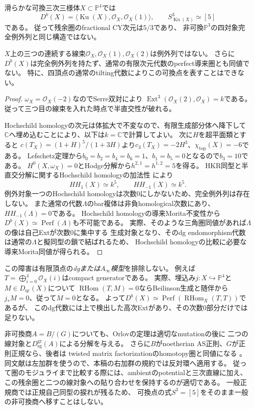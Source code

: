 滑らかな可換三次三様体$X\subset\mathbb P^4$では
\[
 D^b(X)=\langle\operatorname{Ku}(X),\mathcal O_X,\mathcal O_X(1)\rangle,
 \qquad S_{\operatorname{Ku}(X)}^3\simeq[5]
\]
である\cite[Corollary~4.1]{KuznetsovFractionalCY}。
従って残余圏のfractional CY次元は$5/3$であり、
非可換$\mathbb P^3$の四対象完全例外列と同じ構造ではない。

\begin{proposition}[普通のtilting代数に対する可換点の障害]
\label{prop:cubic-p3-no-ordinary-tilting}
$X$上の三つの連続する線束$\mathcal O_X,\mathcal O_X(1),\mathcal O_X(2)$は例外列ではない。
さらに$D^b(X)$は完全例外列を持たず、通常の有限次元代数のperfect導来圏とも同値でない。
特に、四頂点の通常のtilting代数によりこの可換点を表すことはできない。
\end{proposition}
\begin{proof}
$\omega_X=\mathcal O_X(-2)$なのでSerre双対により
$\operatorname{Ext}^3(\mathcal O_X(2),\mathcal O_X)=k$である。
従って三つ目の線束を入れた時点で半直交性が破れる。

Hochschild homologyの次元は体拡大で不変なので、有限生成部分体へ降下して
$\mathbb C$へ埋め込むことにより、以下は$k=\mathbb C$で計算してよい。
次に$H$を超平面類とすると
$c(T_X)=(1+H)^5/(1+3H)$より$c_3(T_X)=-2H^3$、$\chi_{\mathrm{top}}(X)=-6$である。
Lefschetz定理から$b_0=b_2=b_4=b_6=1$、$b_1=b_5=0$となるので$b_3=10$である。
$H^0(X,\omega_X)=0$とHodge分解から$h^{2,1}=h^{1,2}=5$を得る。
HKR同型と半直交分解に関するHochschild homologyの加法性
\cite[Theorem~8.3, Corollary~7.5]{KuznetsovHochschild}により
\[
 HH_1(X)\simeq k^5,\qquad HH_{-1}(X)\simeq k^5.
\]
例外対象一つのHochschild homologyは次数0にしかないため、完全例外列は存在しない。
また通常の代数$\Lambda$のbar複体は非負homological次数にあり、$HH_{-1}(\Lambda)=0$である。
Hochschild homologyの導来Morita不変性から
$D^b(X)\simeq\operatorname{Perf}(\Lambda)$も不可能である。
実際、そのような三角圏同値があれば$\Lambda$の像は自己Extが次数0に集中する
生成対象となり、そのdg endomorphism代数は通常の$\Lambda$と擬同型の鎖で結ばれるため、
Hochschild homologyの比較に必要な導来Morita同値が得られる。
\end{proof}

この障害は有限頂点の\emph{dgまたは$A_\infty$模型}を排除しない。
例えば$T=\bigoplus_{i=0}^{4}\mathcal O_X(i)$はcompact generatorである。
実際、埋込み$j:X\hookrightarrow\mathbb P^4$と$M\in D_{\mathrm{qc}}(X)$について
$\operatorname{RHom}(T,M)=0$ならBeilinson生成と随伴から$j_*M=0$、従って$M=0$となる。
よって$D^b(X)\simeq\operatorname{Perf}(\operatorname{RHom}_X(T,T))$であるが、
このdg代数には上で検出した高次Extがあり、その次数0部分だけでは足りない。

非可換商$A=B/(G)$についても、Orlovの定理は適切なmutationの後に
二つの線対象と$D^{\mathrm{gr}}_{\mathrm{sg}}(A)$による分解を与える。
さらに$B$がnoetherian AS正則、$G$が正則正規なら、後者は
twisted matrix factorizationのhomotopy圏と同値になる
\cite[公刊版, Theorem~5.8]{CSBGCCKM}。
同文献は左加群を使うので、本稿の右加群の規約では反対環へ適用する。
従って圏のモジュライまで比較する際には、ambientのpotentialと三次直線に加え、
この残余圏と二つの線対象への貼り合わせを保持するのが適切である。
一般正規商では正規自己同型の捩れが残るため、
可換点の式$S^3=[5]$をそのまま一般の非可換商へ移すことはしない。
